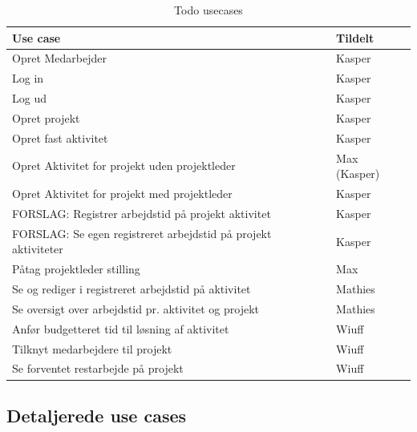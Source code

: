 \begin{table}[H]
    \centering
    \caption{Todo usecases}
    \begin{tabular}{ll}
        Use case                                                        & Tildelt      \\
        \midrule
        Opret Medarbejder                                               & Kasper       \\
        Log in                                                          & Kasper       \\
        Log ud                                                          & Kasper       \\
        Opret projekt                                                   & Kasper       \\
        Opret fast aktivitet                                            & Kasper       \\
        Opret Aktivitet for projekt uden projektleder                   & Max (Kasper) \\
        Opret Aktivitet for projekt med projektleder                    & Kasper       \\
        FORSLAG: Registrer arbejdstid på projekt aktivitet              & Kasper       \\
        FORSLAG: Se egen registreret arbejdstid på projekt aktiviteter  & Kasper       \\
        Påtag projektleder stilling                                     & Max          \\
        Se og rediger i registreret arbejdstid på aktivitet             & Mathies      \\
        Se oversigt over arbejdstid pr. aktivitet og projekt            & Mathies      \\
        Anfør budgetteret tid til løsning af aktivitet                  & Wiuff        \\
        Tilknyt medarbejdere til projekt                                & Wiuff        \\
        Se forventet restarbejde på projekt                              & Wiuff        \\
    \end{tabular}
\end{table}


\subsection{Detaljerede use cases}
